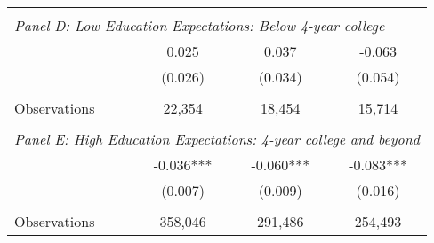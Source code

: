 {\begin{tabular}{lccc}
&  &  &   \\
\multicolumn{4}{l}{\textit{Panel D: Low Education Expectations: Below 4-year college}} \\
\hspace{3mm}        &       0.025   &       0.037   &      -0.063   \\
                    &     (0.026)   &     (0.034)   &     (0.054)   \\
                    &               &               &               \\
\hspace{3mm}Observations&      22,354   &      18,454   &      15,714   \\
 
&  &  &   \\
\multicolumn{4}{l}{\textit{Panel E: High Education Expectations: 4-year college and beyond}} \\
\hspace{3mm}        &      -0.036***&      -0.060***&      -0.083***\\
                    &     (0.007)   &     (0.009)   &     (0.016)   \\
                    &               &               &               \\
\hspace{3mm}Observations&     358,046   &     291,486   &     254,493   \\
 

\bottomrule
\end{tabular}
}
